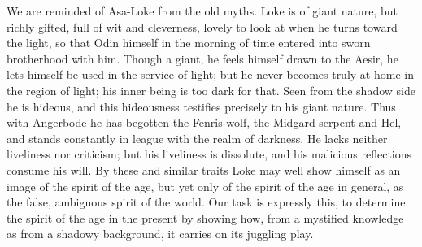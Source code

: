 \documentclass[12pt]{book}
\newcommand{\opage}[1]{\marginnote{\footnotesize\textit{[#1]}}}
\begin{document}
We are reminded of Asa-Loke from the old myths. Loke is of giant nature,
but richly gifted, full of wit and cleverness, lovely to look at when he
turns toward the light, so that Odin himself in the morning of time
entered into sworn brotherhood with him. Though a giant, he feels
himself drawn to the Aesir, he lets himself be used in the service of
light;
\opage{58}\setcounter{footnote}{0}%
but he never becomes truly at home in the region of light; his inner
being is too dark for that. Seen from the shadow side he is hideous, and
this hideousness testifies precisely to his giant nature. Thus with
Angerbode he has begotten the Fenris wolf, the Midgard serpent and Hel,
and stands constantly in league with the realm of darkness. He lacks
neither liveliness nor criticism; but his liveliness is dissolute, and
his malicious reflections consume his will. By these and similar traits
Loke may well show himself as an image of the spirit of the age, but
yet only of the spirit of the age in general, as the false, ambiguous
spirit of the world. Our task is expressly this, to determine the spirit
of the age in the present by showing how, from a mystified knowledge as
from a shadowy background, it carries on its juggling play.
\end{document}
